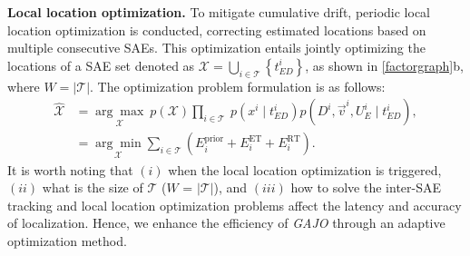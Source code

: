 \textbf{Local location optimization.}
To mitigate cumulative drift, periodic local location optimization is conducted, correcting estimated locations based on multiple consecutive SAEs. 
This optimization entails jointly optimizing the locations of a SAE set denoted as $\mathcal{X}=\underset{i \in \mathcal{T}}{\bigcup}\left\{t_{ED}^i\right\}$, as shown in \fig \ref{factorgraph}b, where $W=|\mathcal{T}|$.
The optimization problem formulation is as follows:
\begin{equation}
\begin{aligned}
\hat{\boldsymbol{\mathcal{X}}} & =\underset{\boldsymbol{\mathcal{X}}}{\arg \max } \ p(\boldsymbol{\mathcal{X}}) \prod_{i \in \mathcal{T}} \ p\left(x^i \mid t_{ED}^i\right) p\left(D^i, \vec{v}^i, U_E^{i} \mid t_{ED}^i\right), \\
& = \underset{\boldsymbol{\mathcal{X}}}{\arg \min } \sum_{i \in \mathcal{T}}\left(E_i^{\mathrm{prior}}+E_i^{\mathrm{ET}}+E_i^{\mathrm{RT}}\right) .
\end{aligned}
\label{local_location}
\end{equation}
It is worth noting that $(i)$ when the local location optimization is triggered, $(ii)$ what is the size of $\mathcal{T}$ ($W$ = $|\mathcal{T}|$), and $(iii)$ how to solve the inter-SAE tracking and local location optimization problems affect the latency and accuracy of localization.
Hence, we enhance the efficiency of \textit{GAJO} through an adaptive optimization method.

